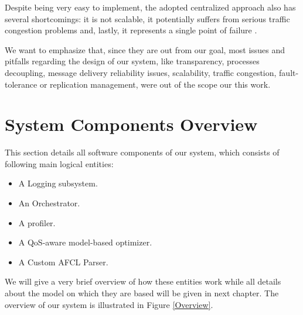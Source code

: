\documentclass[12pt,a4paper]{report}
\begin{document}
Despite being very easy to implement, the adopted centralized approach also has several shortcomings: it is not scalable, it potentially suffers from serious traffic congestion problems and, lastly, it represents a single point of failure \cite{SDCC}. 

We want to emphasize that, since they are out from our goal, most issues and pitfalls regarding the design of our system, like transparency, processes decoupling, message delivery reliability issues, scalability, traffic congestion, fault-tolerance or replication management, were out of the scope our this work.

\section{System Components Overview}

This section details all software components of our system, which consists of following main logical entities:

\begin{itemize}
	\item A Logging subsystem.
	\item An Orchestrator.
	\item A profiler.
	\item A QoS-aware model-based optimizer.
	\item A Custom AFCL Parser.
\end{itemize}

We will give a very brief overview of how these entities work while all details about the model on which they are based will be given in next chapter. The overview of our system is illustrated in Figure \ref{Overview}.
\end{document}
